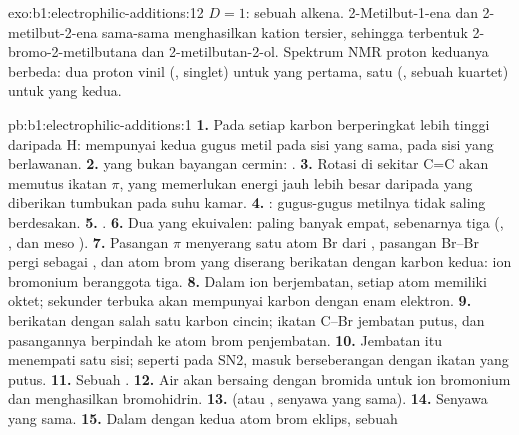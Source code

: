 \begin{solution}{exo:b1:electrophilic-additions:12}
$D = 1$: sebuah alkena. 2-Metilbut-1-ena dan 2-metilbut-2-ena sama-sama
menghasilkan kation tersier, sehingga terbentuk 2-bromo-2-metilbutana dan
2-metilbutan-2-ol. Spektrum NMR proton keduanya berbeda: dua proton vinil
(, singlet) untuk yang pertama, satu (, sebuah kuartet)
untuk yang kedua.
\end{solution}

\begin{solution}{pb:b1:electrophilic-additions:1}
\textbf{1.} Pada setiap karbon  berperingkat lebih tinggi daripada
H:  mempunyai kedua gugus metil pada sisi yang sama,  pada
sisi yang berlawanan.
\textbf{2.}  yang bukan bayangan cermin: .
\textbf{3.} Rotasi di sekitar C=C akan memutus ikatan $\pi$, yang
memerlukan energi jauh lebih besar daripada yang diberikan tumbukan pada
suhu kamar.
\textbf{4.} : gugus-gugus metilnya tidak saling berdesakan.
\textbf{5.} .
\textbf{6.} Dua  yang ekuivalen: paling banyak empat,
sebenarnya tiga (, , dan meso ).
\textbf{7.} Pasangan $\pi$ menyerang satu atom Br dari , pasangan
Br--Br pergi sebagai , dan  atom brom yang
diserang berikatan dengan karbon kedua: ion bromonium beranggota tiga.
\textbf{8.} Dalam ion berjembatan, setiap atom memiliki oktet; 
sekunder terbuka akan mempunyai karbon dengan enam elektron.
\textbf{9.}   berikatan dengan salah satu
karbon cincin; ikatan C--Br jembatan putus, dan pasangannya berpindah ke
atom brom penjembatan.
\textbf{10.} Jembatan itu menempati satu sisi; seperti pada SN2,
 masuk berseberangan dengan ikatan yang putus.
\textbf{11.} Sebuah .
\textbf{12.} Air akan bersaing dengan bromida untuk ion bromonium dan
menghasilkan bromohidrin.
\textbf{13.}  (atau , senyawa yang sama).
\textbf{14.} Senyawa yang sama.
\textbf{15.} Dalam  dengan kedua atom brom eklips, sebuah

\end{solution}
